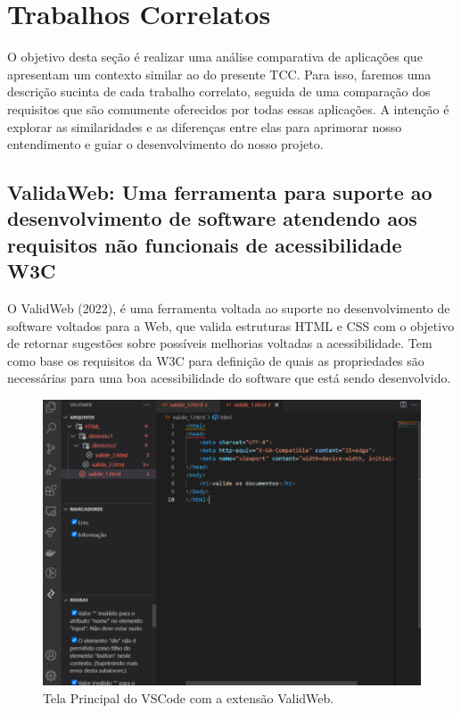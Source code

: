 \chapter{Trabalhos Correlatos}

O objetivo desta seção é realizar uma análise comparativa de aplicações que apresentam um contexto similar ao do presente TCC. Para isso, faremos uma descrição sucinta de cada trabalho correlato, seguida de uma comparação dos requisitos que são comumente oferecidos por todas essas aplicações. A intenção é explorar as similaridades e as diferenças entre elas para aprimorar nosso entendimento e guiar o desenvolvimento do nosso projeto.

\section{ValidaWeb: Uma ferramenta para suporte ao desenvolvimento de software atendendo aos requisitos não funcionais de acessibilidade W3C}

O ValidWeb (2022), é uma ferramenta voltada ao suporte no desenvolvimento de software voltados para a Web, que valida estruturas HTML e CSS com o objetivo de retornar sugestões sobre possíveis melhorias voltadas a acessibilidade. Tem como base os requisitos da W3C para definição de quais as propriedades são necessárias para uma boa acessibilidade do software que está sendo desenvolvido.

\begin{figure}[!h]
	\centering
	\caption{Tela Principal do VSCode com a extensão ValidWeb.}
	\includegraphics[width=432pt]{Assets/ValidaWeb.png}
\end{figure}

